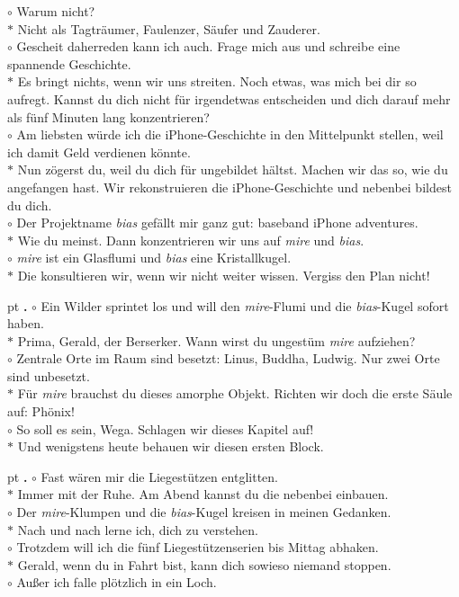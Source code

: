 \documentclass[10pt,a4paper]{article}
\newcounter{notec}
\newcommand\notep[1]{%
  \stepcounter{notec}
  \vskip #1pt
  {\bf\arabic{notec}.}
}
\begin{document}
\begin{mdframed}[style=daystyle]
  $\circ$ Warum nicht? \\
  $\ast$ Nicht als Tagträumer, Faulenzer, Säufer und Zauderer. \\
  $\circ$ Gescheit daherreden kann ich auch. Frage mich aus und schreibe eine
  spannende Geschichte. \\
  $\ast$ Es bringt nichts, wenn wir uns streiten. Noch etwas, was mich bei dir
  so aufregt. Kannst du dich nicht für irgendetwas entscheiden und dich darauf
  mehr als fünf Minuten lang konzentrieren? \\
  $\circ$ Am liebsten würde ich die iPhone-Geschichte in den Mittelpunkt
  stellen, weil ich damit Geld verdienen könnte. \\
  $\ast$ Nun zögerst du, weil du dich für ungebildet hältst. Machen wir das so,
  wie du angefangen hast. Wir rekonstruieren die iPhone-Geschichte und nebenbei
  bildest du dich. \\
  $\circ$ Der Projektname {\it bias} gefällt mir ganz gut: baseband iPhone
  adventures. \\
  $\ast$ Wie du meinst. Dann konzentrieren wir uns auf {\it mire} und {\it bias}. \\
  $\circ$ {\it mire} ist ein Glasflumi und {\it bias} eine Kristallkugel. \\
  $\ast$ Die konsultieren wir, wenn wir nicht weiter wissen. Vergiss den Plan
  nicht!

  \notep 4 $\circ$ Ein Wilder sprintet los und will den {\it mire}-Flumi und die
  {\it bias}-Kugel sofort haben. \\
  $\ast$ Prima, Gerald, der Berserker. Wann wirst du ungestüm {\it mire}
  aufziehen? \\
  $\circ$ Zentrale Orte im Raum sind besetzt: Linus, Buddha, Ludwig. Nur zwei
  Orte sind unbesetzt. \\
  $\ast$ Für {\it mire} brauchst du dieses amorphe Objekt. Richten wir doch die
  erste Säule auf: Phönix! \\
  $\circ$ So soll es sein, Wega. Schlagen wir dieses Kapitel auf! \\
  $\ast$ Und wenigstens heute behauen wir diesen ersten Block.

  \notep 4 $\circ$ Fast wären mir die Liegestützen entglitten. \\
  $\ast$ Immer mit der Ruhe. Am Abend kannst du die nebenbei einbauen. \\
  $\circ$ Der {\it mire}-Klumpen und die {\it bias}-Kugel kreisen in meinen
  Gedanken. \\
  $\ast$ Nach und nach lerne ich, dich zu verstehen. \\
  $\circ$ Trotzdem will ich die fünf Liegestützenserien bis Mittag abhaken. \\
  $\ast$ Gerald, wenn du in Fahrt bist, kann dich sowieso niemand stoppen. \\
  $\circ$ Außer ich falle plötzlich in ein Loch.


\end{mdframed}
\end{document}
